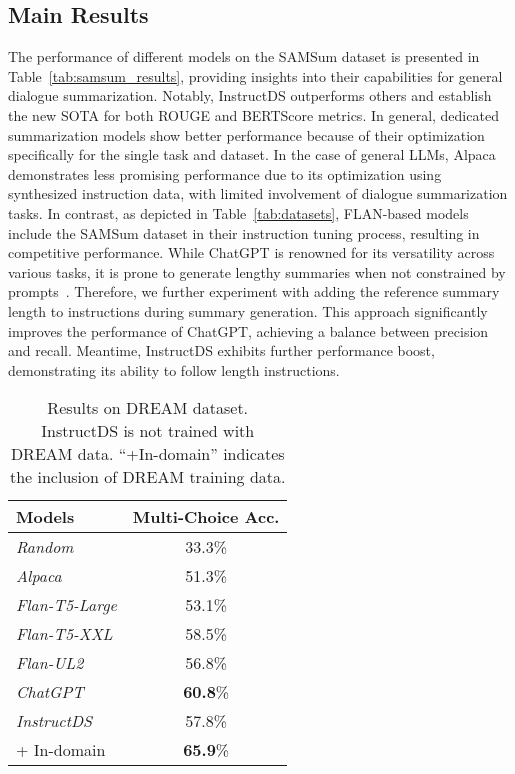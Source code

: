 \documentclass[11pt]{article}
\begin{document}
    \subsection{Main Results}
    \label{sec:exp_main_results}

        The performance of different models on the SAMSum dataset is presented in Table~\ref{tab:samsum_results}, providing insights into their capabilities for general dialogue summarization. Notably, InstructDS outperforms others and establish the new SOTA for both ROUGE and BERTScore metrics. In general, dedicated summarization models show better performance because of their optimization specifically for the single task and dataset. In the case of general LLMs, Alpaca demonstrates less promising performance due to its optimization using synthesized instruction data, with limited involvement of dialogue summarization tasks. In contrast, as depicted in Table~\ref{tab:datasets}, FLAN-based models include the SAMSum dataset in their instruction tuning process, resulting in competitive performance. While ChatGPT is renowned for its versatility across various tasks, it is prone to generate lengthy summaries when not constrained by prompts~\cite{qin2023chatgpt}. Therefore, we further experiment with adding the reference summary length to instructions during summary generation. This approach significantly improves the performance of ChatGPT, achieving a balance between precision and recall. Meantime, InstructDS exhibits further performance boost, demonstrating its ability to follow length instructions.        

\begin{table}[t]
        \centering
        \begin{adjustbox}{width=0.42\textwidth,center}
        \begin{tabular}{| l | c |}
        \toprule
        Models & Multi-Choice Acc. \\
        \hline 
        \emph{Random} & 33.3\% \\
        \hline 
        \emph{Alpaca} & 51.3\% \\
        \emph{Flan-T5-Large} & 53.1\% \\ 
        \emph{Flan-T5-XXL} & 58.5\% \\ 
        \emph{Flan-UL2} & 56.8\% \\ 
        \emph{ChatGPT} & \textbf{60.8}\% \\ 
        \hline
        \emph{InstructDS} & 57.8\% \\
         + In-domain & \textbf{65.9}\% \\ 
        \bottomrule
        \end{tabular}
        \end{adjustbox}
        \caption{Results on DREAM dataset. InstructDS is not trained with DREAM data. ``+In-domain'' indicates the inclusion of DREAM training data.}
        \label{tab:dream_results}
    \end{table}
\end{document}
